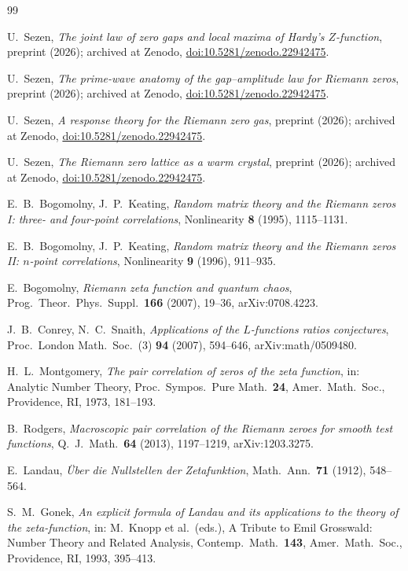 \documentclass[12pt]{amsart}
\begin{document}
\begin{thebibliography}{99}

 U.~Sezen, \emph{The joint law of zero gaps and local
maxima of Hardy's $Z$-function}, preprint (2026); archived at Zenodo,
\href{https://doi.org/10.5281/zenodo.22942475}{doi:10.5281/zenodo.22942475}.

 U.~Sezen, \emph{The prime-wave anatomy of the
gap--amplitude law for Riemann zeros}, preprint (2026); archived at Zenodo,
\href{https://doi.org/10.5281/zenodo.22942475}{doi:10.5281/zenodo.22942475}.

 U.~Sezen, \emph{A response theory for the Riemann
zero gas}, preprint (2026); archived at Zenodo,
\href{https://doi.org/10.5281/zenodo.22942475}{doi:10.5281/zenodo.22942475}.

 U.~Sezen, \emph{The Riemann zero lattice as a warm
crystal}, preprint (2026); archived at Zenodo,
\href{https://doi.org/10.5281/zenodo.22942475}{doi:10.5281/zenodo.22942475}.

 E.~B.~Bogomolny, J.~P.~Keating, \emph{Random matrix theory and the
Riemann zeros I: three- and four-point correlations}, Nonlinearity \textbf{8}
(1995), 1115--1131.

 E.~B.~Bogomolny, J.~P.~Keating, \emph{Random matrix theory and the
Riemann zeros II: $n$-point correlations}, Nonlinearity \textbf{9} (1996), 911--935.

 E.~Bogomolny, \emph{Riemann zeta function and quantum chaos},
Prog.\ Theor.\ Phys.\ Suppl.\ \textbf{166} (2007), 19--36, arXiv:0708.4223.

 J.~B.~Conrey, N.~C.~Snaith, \emph{Applications of the $L$-functions
ratios conjectures}, Proc.\ London Math.\ Soc.\ (3) \textbf{94} (2007), 594--646,
arXiv:math/0509480.

 H.~L.~Montgomery, \emph{The pair correlation of zeros of the zeta
function}, in: Analytic Number Theory, Proc.\ Sympos.\ Pure Math.\ \textbf{24},
Amer.\ Math.\ Soc., Providence, RI, 1973, 181--193.

 B.~Rodgers, \emph{Macroscopic pair correlation of the Riemann
zeroes for smooth test functions}, Q.\ J.\ Math.\ \textbf{64} (2013), 1197--1219,
arXiv:1203.3275.

 E.~Landau, \emph{\"Uber die Nullstellen der Zetafunktion},
Math.\ Ann.\ \textbf{71} (1912), 548--564.

 S.~M.~Gonek, \emph{An explicit formula of Landau and its
applications to the theory of the zeta-function}, in: M.~Knopp et al.\ (eds.), A
Tribute to Emil Grosswald: Number Theory and Related Analysis, Contemp.\ Math.\
\textbf{143}, Amer.\ Math.\ Soc., Providence, RI, 1993, 395--413.


\end{thebibliography}
\end{document}
